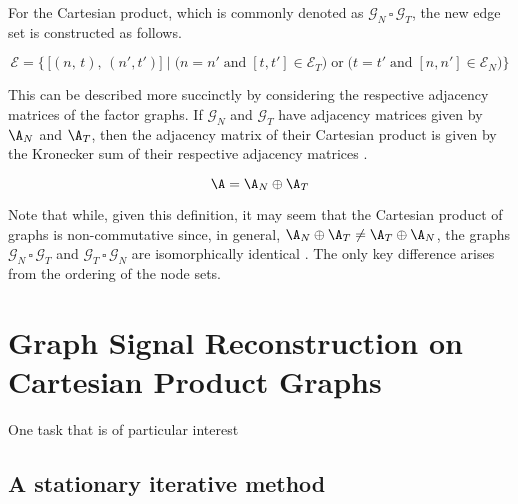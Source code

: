 For the Cartesian product, which is commonly denoted as $\mathcal{G}_N \, \square \, \mathcal{G}_T$, the new edge set is constructed as follows. 

\begin{equation}
    \mathcal{E} = \Big\{\, \big[(n, \, t), \, (n',  t') \big] \; \Big| \; \big(n = n' \; \text{and} \; [t, t'] \in \mathcal{E}_T \big) \; \text{or} \; \big(t = t' \; \text{and} \; [n, n'] \in \mathcal{E}_N\big)  \Big\}
\end{equation}
     

This can be described more succinctly by considering the respective adjacency matrices of the factor graphs. If $\mathcal{G}_N$ and $\mathcal{G}_T$ have adjacency matrices given by $\A_N$ and $\A_T$, then the adjacency matrix of their Cartesian product is given by the Kronecker sum of their respective adjacency matrices \citep{Fiedler1973}. 

\begin{equation}
    \A = \A_N \oplus \A_T 
\end{equation}

Note that while, given this definition, it may seem that the Cartesian product of graphs is non-commutative since, in general, $\A_N \oplus \A_T  \neq \A_T \oplus \A_N $, the graphs $\mathcal{G}_N \, \square \, \mathcal{G}_T$ and $\mathcal{G}_T \, \square \, \mathcal{G}_N$ are isomorphically identical \citep{Imrich2000}. The only key difference arises from the ordering of the node sets. 




\section{Graph Signal Reconstruction on Cartesian Product Graphs}

\label{sec:gsr_cpg}

One task that is of particular interest 

\subsection{A stationary iterative method}

